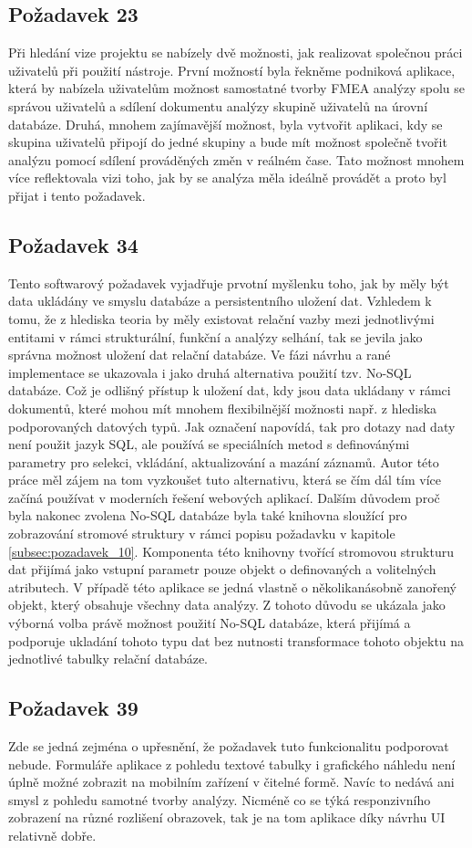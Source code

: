 \subsection{Požadavek 23}
Při hledání vize projektu se nabízely dvě možnosti, jak realizovat společnou práci uživatelů při použití nástroje. První možností byla řekněme podniková aplikace, která by nabízela uživatelům možnost samostatné tvorby FMEA analýzy spolu se správou uživatelů a sdílení dokumentu analýzy skupině uživatelů na úrovní databáze. Druhá, mnohem zajímavější možnost, byla vytvořit aplikaci, kdy se skupina uživatelů připojí do jedné skupiny a bude mít možnost společně tvořit analýzu pomocí sdílení prováděných změn v reálném čase. Tato možnost mnohem více reflektovala vizi toho, jak by se analýza měla ideálně provádět a proto byl přijat i tento požadavek.  

\subsection{Požadavek 34}
\label{sec:pozadavekMongo}
Tento softwarový požadavek vyjadřuje prvotní myšlenku toho, jak by měly být data ukládány ve smyslu databáze a persistentního uložení dat. Vzhledem k tomu, že z hlediska teoria by měly existovat relační vazby mezi jednotlivými entitami v rámci strukturální, funkční a analýzy selhání, tak se jevila jako správna možnost uložení dat relační databáze. Ve fázi návrhu a rané implementace se ukazovala i jako druhá alternativa použití tzv. No-SQL databáze. Což je odlišný přístup k uložení dat, kdy jsou data ukládany v rámci dokumentů, které mohou mít mnohem flexibilnější možnosti např. z hlediska podporovaných datových typů. Jak označení napovídá, tak pro dotazy nad daty není použit jazyk SQL, ale používá se speciálních metod s definovánými parametry pro selekci, vkládání, aktualizování a mazání záznamů. Autor této práce měl zájem na tom vyzkoušet tuto alternativu, která se čím dál tím více začíná používat v moderních řešení webových aplikací. Dalším důvodem proč byla nakonec zvolena No-SQL databáze byla také knihovna sloužící pro zobrazování stromové struktury v rámci popisu požadavku v kapitole \ref{subsec:pozadavek_10}. Komponenta této knihovny tvořící stromovou strukturu dat přijímá jako vstupní parametr pouze objekt o definovaných a volitelných atributech. V případě této aplikace se jedná vlastně o několikanásobně zanořený objekt, který obsahuje všechny data analýzy. Z tohoto důvodu se ukázala jako výborná volba právě možnost použití No-SQL databáze, která přijímá a podporuje ukladání tohoto typu dat bez nutnosti transformace tohoto objektu na jednotlivé tabulky relační databáze. 

\subsection{Požadavek 39}
Zde se jedná zejména o upřesnění, že požadavek tuto funkcionalitu podporovat nebude. Formuláře aplikace z pohledu textové tabulky i grafického náhledu není úplně možné zobrazit na mobilním zařízení v čitelné formě. Navíc to nedává ani smysl z pohledu samotné tvorby analýzy. Nicméně co se týká responzivního zobrazení na různé rozlišení obrazovek, tak je na tom aplikace díky návrhu UI relativně dobře.

